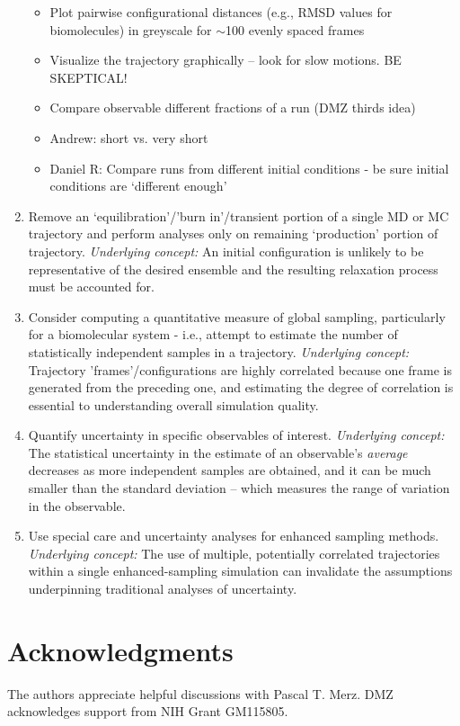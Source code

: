 \documentclass[9pt,bestpractices]{livecoms}
\begin{document}
\begin{enumerate}
\begin{itemize}
    \item Plot pairwise configurational distances (e.g., RMSD values for biomolecules) in greyscale for $\sim$100 evenly spaced frames
    \item Visualize the trajectory graphically -- look for slow motions.  BE SKEPTICAL!
    \item Compare observable different fractions of a run (DMZ thirds idea)
    \item Andrew: short vs. very short
    \item Daniel R: Compare runs from different initial conditions - be sure initial conditions are ‘different enough’
    \end{itemize}
\item
 Remove an ‘equilibration’/’burn in’/transient portion of a single MD or MC trajectory and perform analyses only on remaining ‘production’ portion of trajectory.  \emph{Underlying concept:} An initial configuration is unlikely to be representative of the desired ensemble and the resulting relaxation process must be accounted for.
\item
 Consider computing a quantitative measure of global sampling, particularly for a biomolecular system - i.e., attempt to estimate the number of statistically independent samples in a trajectory.  \emph{Underlying concept:} Trajectory 'frames'/configurations are highly correlated because one frame is generated from the preceding one, and estimating the degree of correlation is essential to understanding overall simulation quality.
\item
 Quantify uncertainty in specific observables of interest.  \emph{Underlying concept:} The statistical uncertainty in the estimate of an observable's \emph{average} decreases as more independent samples are obtained, and it can be much smaller than the standard deviation -- which measures the range of variation in the observable.
\item
 Use special care and uncertainty analyses for enhanced sampling methods.  \emph{Underlying concept:} The use of multiple, potentially correlated trajectories within a single enhanced-sampling simulation can invalidate the assumptions underpinning traditional analyses of uncertainty.
\end{enumerate}









\section{Acknowledgments}
The authors appreciate helpful discussions with Pascal T. Merz.
DMZ acknowledges support from NIH Grant GM115805.



%
\end{document}
